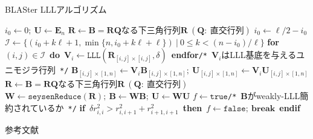 \documentclass[12pt,aspectratio=169,table,dvipdfmx, leqno]{beamer}
\renewcommand{\Comment}[1]{\quad\texttt{/*}~#1~\texttt{*/}}
\begin{document}
\begin{frame}%
\begin{algorithm}[H]
    \footnotesize
    \begin{algorithmic}[1]
        \caption{\footnotesize BLASter LLLアルゴリズム\cite{DPS25}}
        \label{alg_blaster_lll}
        \State $i_0\gets 0;~\bm{U}\gets \bm{E}_n$
        \Do
            \State $\bm{R}\gets \bm{B}=\bm{RQ}$なる下三角行列$\bm{R}~(\bm{Q}:~\text{直交行列})$
            \State $i_0\gets \ell/2-i_0$
            \State $\mathcal{I}\gets \{(i_0+k\ell+1, \min\{n, i_0+k\ell+\ell\})~|~0\le k<(n-i_0)/\ell\}$
            \State \textbf{for}~$(i, j)\in\mathcal{I}$~\textbf{do}~$\bm{V}_i\gets \texttt{LLL}(\bm{R}_{[i, j]\times [i, j]}, \delta)$~\textbf{endfor}\Comment{$\bm{V}_i$はLLL基底を与えるユニモジラ行列}
                \State $\bm{B}_{[i, j]\times [1, n]}\gets \bm{V}_i\bm{B}_{[i, j]\times [1, n]};~\bm{U}_{[i, j]\times [1, n]}\gets \bm{V}_i\bm{U}_{[i, j]\times [1, n]}$
            \EndFor
            \State $\bm{R}\gets \bm{B}=\bm{RQ}$なる下三角行列$\bm{R}~(\bm{Q}:~\text{直交行列})$
            \State $\bm{W}\gets \texttt{seysenReduce}(\bm{R});~\bm{B}\gets\bm{WB};~\bm{U}\gets\bm{WU}$
            \State $f\gets \texttt{true}$\Comment{$\bm{B}$がweakly-LLL簡約されているか}
                \State \textbf{if}~$\delta r_{i, i}^2> r_{i, i+1}^2+r_{i+1, i+1}^2$~\textbf{then}~$f\gets\texttt{false};~\textbf{break}$~\textbf{endif}
            \EndFor
    \end{algorithmic}
\end{algorithm}
\end{frame}

\begin{frame}[allowframebreaks]{参考文献}
\beamertemplatetextbibitems

\typeout{}

\end{frame}
\end{document}
